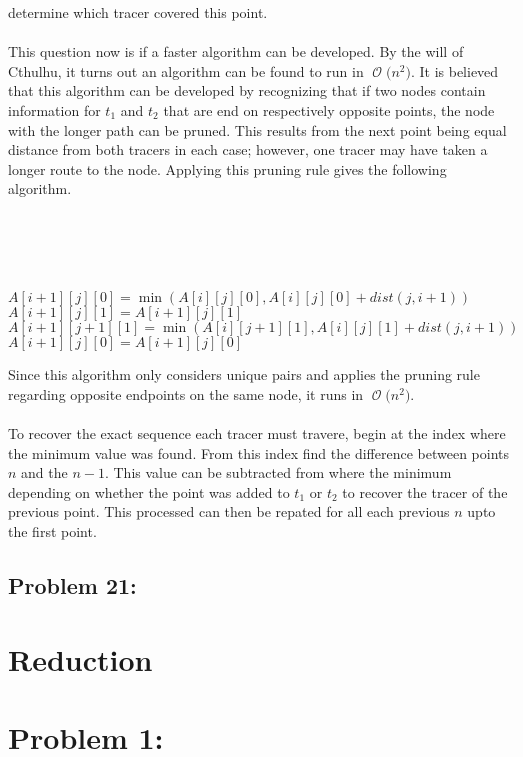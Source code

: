 \documentclass[12pt]{article}
\newcommand{\BigO}[1]{\ensuremath{\operatorname{\mathcal{O}}\bigl(#1\bigr)}}
\begin{document}
determine which tracer covered this point.\\\\
This question now is if a faster algorithm can be developed.
By the will of Cthulhu, it turns out an algorithm can be
found to run in \BigO{n^2}.
It is believed that this algorithm can be developed by recognizing that
if two nodes contain information for $t_1$ and $t_2$ that are
end on respectively opposite points, the node with the longer
path can be pruned.  This results from the next point being
equal distance from both tracers in each case; however,
one tracer may have taken a longer route to the node.  Applying
this pruning rule gives the following algorithm.\\\\
\begin{algorithm}[H]
\\
\\
\\
 {
     {
         {
            $A[i+1][j][0] = \min(A[i][j][0], A[i][j][0] + dist(j,i+1))$\\
            $A[i+1][j][1] = A[i+1][j][1]$\\
            $A[i+1][j+1][1] = \min(A[i][j+1][1], A[i][j][1] + dist(j,i+1))$\\
            $A[i+1][j][0] = A[i+1][j][0]$\\
        }
    }
}
\end{algorithm}
Since this algorithm only considers unique pairs and applies the pruning
rule regarding opposite endpoints on the same node, it runs in \BigO{n^2}.\\\\
To recover the exact sequence each tracer must travere, begin at the 
index where the minimum value was found. From this index find the difference
between points $n$ and the $n-1$.  This value can be subtracted from where the
minimum depending on whether the point was added to $t_1$ or $t_2$ to recover
the tracer of the previous point.  This processed can then be repated for all
each previous $n$ upto the first point.   
\subsection*{Problem 21: }

\section*{Reduction}
\section*{Problem 1: }
\end{document}
